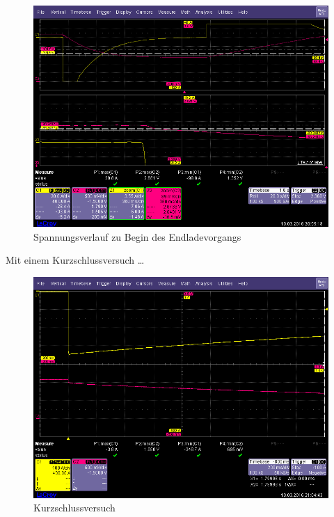\documentclass[a4,paper,fleqn]{article}
\begin{document}
\begin{figure}[h!]
    \centering
    \includegraphics[width=1.0\textwidth, trim=0 20 0 45, clip=true]{fig/discharge1.png}
    \caption{Spannungsverlauf zu Begin des Endladevorgangs}
    \label{fig:discharge_u}
\end{figure}

\noindent
Mit einem Kurzschlussversuch \ldots

\begin{figure}[h!]
    \centering
    \includegraphics[width=1.0\textwidth, trim=0 20 0 45, clip=true]{fig/short.png}
    \caption{Kurzschlussversuch}
    \label{fig:short}
\end{figure}
\end{document}
